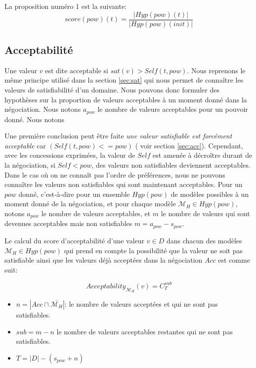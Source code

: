 \documentclass[runningheads,a4paper]{llncs}
\begin{document}
La proposition numéro 1 est la suivante:
$$score(pow)(t) = \frac{|Hyp(pow)(t)|}{|Hyp(pow)(init)|}$$

\subsection{Acceptabilité}

Une valeur $v$ est dite acceptable si $sat(v) > Self(t, pow)$. Nous reprenons le même principe utilisé dans la section \ref{sec:sat} qui nous permet de connaître les valeurs de satisfiabilité d'un domaine. Nous pouvons donc formuler des hypothèses sur la proportion de valeurs acceptables à un moment donné dans la négociation. Nous notons $a_{pow}$ le nombre de valeurs acceptables pour un pouvoir donné. Nous notons 

Une première conclusion peut être faite \emph{une valeur \textit{satisfiable} est forcément \textit{acceptable}} car $(Self(t,pow) <= pow)$ ( voir section \ref{sec:acc}). Cependant, avec les concessions exprimées, la valeur de $Self$ est amenée à décroître durant de la négociation, si $Self<pow$, des valeurs non satisfiables deviennent acceptables. Dans le cas où on ne connaît pas l'ordre de préférences, nous ne pouvons connaître les valeurs non satisfiables qui sont maintenant acceptables. Pour un $pow$ donné, c'est-à-dire pour un ensemble $Hyp(pow)$ de modèles possibles à un moment donné de la négociation, et pour chaque modèle $\mathcal{M}_H\in Hyp(pow)$, notons $a_{pow}$ le nombre de valeurs acceptables, et $m$ le nombre de valeurs qui sont devenues acceptables mais non satisfiables $ m= a_{pow} - s_{pow}$. 

Le calcul du score d'acceptabilité d'une valeur $v \in D$ dans chacun des modèles $\mathcal{M}_H\in Hyp(pow)$ qui prend en compte la possibilité que la valeur ne soit pas satisfiable ainsi que les valeurs déjà acceptées dans la négociation $Acc$ est comme suit:


\begin{equation}
Acceptability_{\mathcal{M}_H}(v) =  C_{T}^{sub}
\end{equation}

\begin{itemize}
	\item $n = | Acc \cap \bar{\mathcal{M}_H}|$: le nombre de valeurs acceptées et qui ne sont pas satisfiables.
	\item $sub = m - n $ le nombre de valeurs acceptables restantes qui ne sont pas satisfiables.
	\item $T = |D| - (s_{pow} + n) $
\end{itemize}
\end{document}
